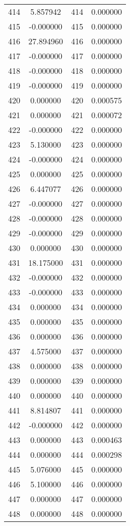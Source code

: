\documentclass[12pt]{article}
\begin{document}
\begin{longtable}{@{}cccc@{}}
414 & 5.857942 & 414 & 0.000000 \\
415 & -0.000000 & 415 & 0.000000 \\
416 & 27.894960 & 416 & 0.000000 \\
417 & -0.000000 & 417 & 0.000000 \\
418 & -0.000000 & 418 & 0.000000 \\
419 & -0.000000 & 419 & 0.000000 \\
420 & 0.000000 & 420 & 0.000575 \\
421 & 0.000000 & 421 & 0.000072 \\
422 & -0.000000 & 422 & 0.000000 \\
423 & 5.130000 & 423 & 0.000000 \\
424 & -0.000000 & 424 & 0.000000 \\
425 & 0.000000 & 425 & 0.000000 \\
426 & 6.447077 & 426 & 0.000000 \\
427 & -0.000000 & 427 & 0.000000 \\
428 & -0.000000 & 428 & 0.000000 \\
429 & -0.000000 & 429 & 0.000000 \\
430 & 0.000000 & 430 & 0.000000 \\
431 & 18.175000 & 431 & 0.000000 \\
432 & -0.000000 & 432 & 0.000000 \\
433 & -0.000000 & 433 & 0.000000 \\
434 & 0.000000 & 434 & 0.000000 \\
435 & 0.000000 & 435 & 0.000000 \\
436 & 0.000000 & 436 & 0.000000 \\
437 & 4.575000 & 437 & 0.000000 \\
438 & 0.000000 & 438 & 0.000000 \\
439 & 0.000000 & 439 & 0.000000 \\
440 & 0.000000 & 440 & 0.000000 \\
441 & 8.814807 & 441 & 0.000000 \\
442 & -0.000000 & 442 & 0.000000 \\
443 & 0.000000 & 443 & 0.000463 \\
444 & 0.000000 & 444 & 0.000298 \\
445 & 5.076000 & 445 & 0.000000 \\
446 & 5.100000 & 446 & 0.000000 \\
447 & 0.000000 & 447 & 0.000000 \\
448 & 0.000000 & 448 & 0.000000 \\

\end{longtable}
\end{document}
